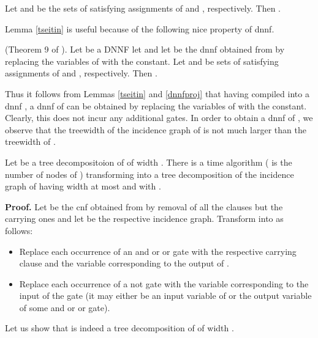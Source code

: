 \documentclass{llncs}
\begin{document}
\begin{lemma} \label{tseitin}
Let  and  be the sets of satisfying assignments of  and ,
respectively. Then .
\end{lemma}

Lemma \ref{tseitin} is useful because of the following nice property of {\sc dnnf}.
\begin{lemma} \label{dnnfproj} (Theorem 9 of \cite{DarwicheJACM}).
Let  be a DNNF let  and let  be the {\sc dnnf} obtained from 
by replacing the variables of  with the  constant.
Let  and  be sets of satisfying assignments of  and , respectively.
Then . 
\end{lemma}

Thus it follows from Lemmas \ref{tseitin} and \ref{dnnfproj} that having compiled  into a {\sc dnnf} ,
a {\sc dnnf}  of  can be obtained by replacing the variables of  with the 
constant. Clearly, this does not incur any additional gates. In order to obtain a {\sc dnnf} of , we observe 
that the treewidth of the incidence graph of  is not much larger than the treewidth of .


\begin{lemma} \label{tseitindecomp}
Let  be a tree decompositoion of  of width .
There is a  time algorithm ( is the number of nodes of ) transforming
 into a tree decomposition  of the incidence graph  of 
 having width at most  and with .
\end{lemma}

{\bf Proof.}
Let  be the {\sc cnf} obtained from  by removal of all the clauses but the carrying ones and let 
be the respective incidence graph. Transform  into  as follows:
\begin{itemize}
\item Replace each occurrence of an {\sc and} or {\sc or} gate  with the respective carrying clause and the
      variable corresponding to the output of .
\item Replace each occurrence of a {\sc not} gate with the variable corresponding to the input of the gate
      (it may either be an input variable of  or the output variable of some {\sc and} or {\sc or} gate).			
\end{itemize}
Let us show that  is indeed a tree decomposition 
of  of width .
\end{document}
